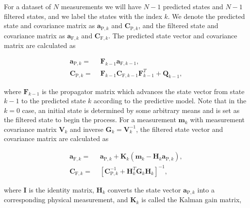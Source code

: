 \documentclass{JINST}
\begin{document}
For a dataset of $N$ measurements we will have $N-1$ predicted states and $N-1$ filtered states, and we label the states with the index $k$.  We denote the predicted state and covariance matrix as $\mathbf{a}_{\mathrm{P},k}$ and $\mathbf{C}_{\mathrm{P},k}$, and the filtered state and covariance matrix as $\mathbf{a}_{\mathrm{F},k}$ and $\mathbf{C}_{\mathrm{F},k}$.  The predicted state vector and covariance matrix are calculated as

\begin{equation}
\begin{split}
\mathbf{a}_{\mathrm{P},k} = & \,\,\mathbf{F}_{k-1}\mathbf{a}_{\mathrm{F},k-1},\\
\mathbf{C}_{\mathrm{P},k} = & \,\,\mathbf{F}_{k-1}\mathbf{C}_{\mathrm{F},k-1}\mathbf{F}_{k-1}^{T} + \mathbf{Q}_{k-1},
\end{split}
\end{equation}

\noindent where $\mathbf{F}_{k-1}$ is the propagator matrix which advances the state vector from state $k-1$ to the predicted state $k$ according to the predictive model.  Note that in the $k = 0$ case, an initial state is determined by some arbitrary means and is set as the filtered state to begin the process.  For a measurement $\mathbf{m}_{k}$ with measurement covariance matrix $\mathbf{V}_{k}$ and inverse $\mathbf{G}_{k} = \mathbf{V}_{k}^{-1}$, the filtered state vector and covariance matrix are calculated as

\begin{equation}
\begin{split}
\mathbf{a}_{\mathrm{F},k} = & \,\,\mathbf{a}_{\mathrm{P},k} + \mathbf{K}_{k}(\mathbf{m}_{k} - \mathbf{H}_{k}\mathbf{a}_{\mathrm{P},k}),\\
\mathbf{C}_{\mathrm{F},k} = & \,\,[\mathbf{C}_{\mathrm{P},k}^{-1} + \mathbf{H}_{k}^{T}\mathbf{G}_{k}\mathbf{H}_{k}]^{-1},
\end{split}
\end{equation}

\noindent where $\mathbf{I}$ is the identity matrix, $\mathbf{H}_{k}$ converts the state vector $\mathbf{a}_{\mathrm{P},k}$ into a corresponding physical measurement, and $\mathbf{K}_{k}$ is called the Kalman gain matrix,
\end{document}
